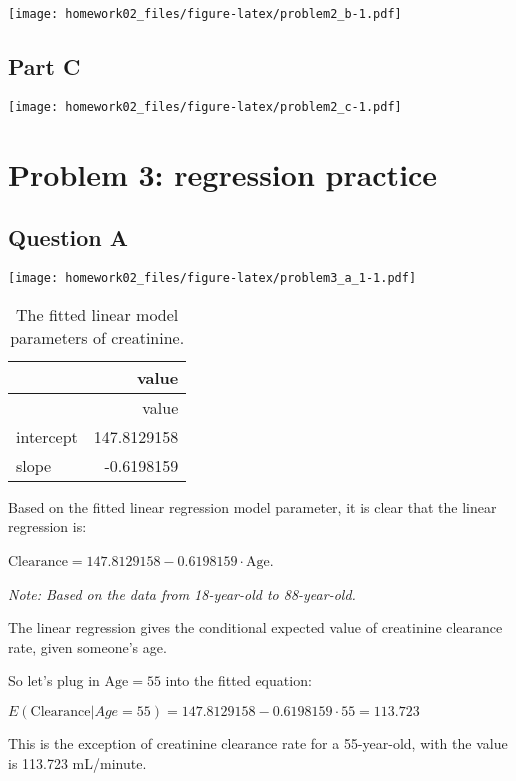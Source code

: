 \documentclass[
]{article}
\begin{document}
\texttt{[image: homework02\_files/figure-latex/problem2\_b-1.pdf]}

\hypertarget{part-c}{%
\subsection{Part C}\label{part-c}}

\texttt{[image: homework02\_files/figure-latex/problem2\_c-1.pdf]}

\hypertarget{problem-3-regression-practice}{%
\section{Problem 3: regression
practice}\label{problem-3-regression-practice}}

\hypertarget{question-a}{%
\subsection{Question A}\label{question-a}}

\texttt{[image: homework02\_files/figure-latex/problem3\_a\_1-1.pdf]}

\begin{longtable}[]{@{}lr@{}}
\caption{The fitted linear model parameters of
creatinine.}\tabularnewline
\toprule\noalign{}
& value \\
\midrule\noalign{}
\endfirsthead
\toprule\noalign{}
& value \\
\midrule\noalign{}
\endhead
\bottomrule\noalign{}
\endlastfoot
intercept & 147.8129158 \\
slope & -0.6198159 \\
\end{longtable}

Based on the fitted linear regression model parameter, it is clear that
the linear regression is:

\(\text{Clearance}=147.8129158-0.6198159\cdot\text{Age}\).

\emph{Note: Based on the data from 18-year-old to 88-year-old.}

The linear regression gives the conditional expected value of creatinine
clearance rate, given someone's age.

So let's plug in \(\text{Age}=55\) into the fitted equation:

\(E(\text{Clearance}|Age=55)=147.8129158-0.6198159\cdot55=113.723\)

This is the exception of creatinine clearance rate for a 55-year-old,
with the value is 113.723 mL/minute.
\end{document}
